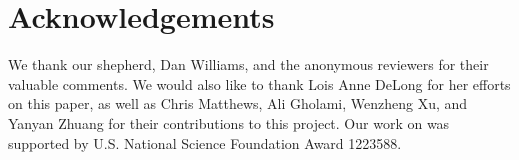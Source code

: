 \section*{Acknowledgements}

We thank our shepherd, Dan Williams, and the anonymous reviewers for their valuable comments. 
We would also like to thank Lois Anne DeLong for her efforts on this paper, 
as well as Chris Matthews, Ali Gholami, Wenzheng Xu, and Yanyan Zhuang for their contributions to this project. 
Our work on \lip was supported by U.S. National Science Foundation Award 1223588. 
